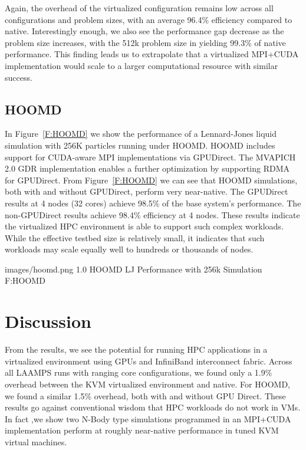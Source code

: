 \documentclass{sigplanconf}
\begin{document}
Again, the overhead of the virtualized configuration remains low across all configurations and problem sizes, with an average 96.4\% efficiency compared to native. Interestingly enough, we also see the performance gap decrease as the problem size increases, with the 512k problem size in yielding 99.3\% of native performance.  This finding leads us to extrapolate that a virtualized MPI+CUDA implementation would scale to a larger computational resource with similar success. 


\subsection{HOOMD}






In Figure~\ref{F:HOOMD} we show the performance of a Lennard-Jones liquid simulation with 256K particles running under HOOMD.  HOOMD includes support for CUDA-aware MPI implementations via GPUDirect.  The MVAPICH 2.0 GDR implementation enables a further optimization by supporting RDMA for GPUDirect. From Figure~\ref{F:HOOMD} we can see that HOOMD simulations, both with and without GPUDirect, perform very near-native.  The GPUDirect results at 4 nodes (32 cores) achieve 98.5\% of the base system's performance.  The non-GPUDirect results achieve 98.4\% efficiency at 4 nodes. These results indicate the virtualized HPC environment is able to support such complex workloads. While the effective testbed size is relatively small, it indicates that such workloads may scale equally well to hundreds or thousands of nodes. 

  {images/hoomd.png}
  {1.0}
  {HOOMD LJ Performance with 256k Simulation}
  {F:HOOMD}


\section{Discussion}

From the results, we see the potential for running HPC applications in a virtualized environment using GPUs and InfiniBand interconnect fabric. Across all LAAMPS runs with ranging core configurations, we found only a 1.9\% overhead between the KVM virtualized environment and native. For HOOMD, we found a similar 1.5\% overhead, both with and without GPU Direct. These results go against conventional wisdom that HPC workloads do not work in VMs. In fact ,we show two N-Body type simulations programmed in an MPI+CUDA implementation perform at roughly near-native performance in tuned KVM virtual machines.  
\end{document}
